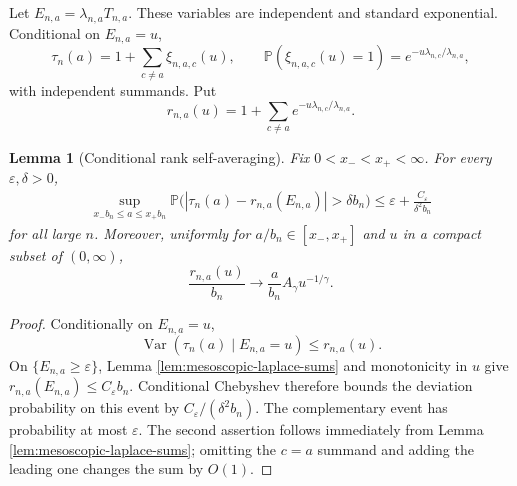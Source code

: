\documentclass[11pt]{article}
\newtheorem{lemma}[theorem]{Lemma}
\theoremstyle{remark}
\newcommand{\Pp}{\mathbb P}
\newcommand{\Var}{\operatorname{Var}}
\begin{document}
Let $E_{n,a}=\lambda_{n,a}T_{n,a}$.  These variables are independent and
standard exponential.  Conditional on $E_{n,a}=u$,
\[
        \tau_n(a)=1+\sum_{c\ne a}\xi_{n,a,c}(u),
        \qquad
        \Pp(\xi_{n,a,c}(u)=1)
        =e^{-u\lambda_{n,c}/\lambda_{n,a}},
\]
with independent summands.  Put
\[
        r_{n,a}(u)=1+\sum_{c\ne a}
        e^{-u\lambda_{n,c}/\lambda_{n,a}}.
\]

\begin{lemma}[Conditional rank self-averaging]
\label{lem:conditional-rank-self-averaging}
Fix $0<x_-<x_+<\infty$.  For every $\varepsilon,\delta>0$,
\[
\begin{aligned}
        \sup_{x_-b_n\le a\le x_+b_n}
        \Pp\bigl(|\tau_n(a)-r_{n,a}(E_{n,a})|>\delta b_n\bigr)
        \le\varepsilon+\frac{C_\varepsilon}{\delta^2b_n}
\end{aligned}
\]
for all large $n$.  Moreover, uniformly for
$a/b_n\in[x_-,x_+]$ and $u$ in a compact subset of $(0,\infty)$,
\[
        \frac{r_{n,a}(u)}{b_n}
        \longrightarrow
        \frac a{b_n}A_\gamma u^{-1/\gamma}.
\]
\end{lemma}

\begin{proof}
Conditionally on $E_{n,a}=u$,
\[
        \Var(\tau_n(a)\mid E_{n,a}=u)\le r_{n,a}(u).
\]
On $\{E_{n,a}\ge\varepsilon\}$, Lemma
\ref{lem:mesoscopic-laplace-sums} and monotonicity in $u$ give
$r_{n,a}(E_{n,a})\le C_\varepsilon b_n$.  Conditional Chebyshev therefore
bounds the deviation probability on this event by
$C_\varepsilon/(\delta^2b_n)$.  The complementary event has probability at
most $\varepsilon$.  The second assertion follows immediately from Lemma
\ref{lem:mesoscopic-laplace-sums}; omitting the $c=a$ summand and adding the
leading one changes the sum by $O(1)$.
\end{proof}
\end{document}
